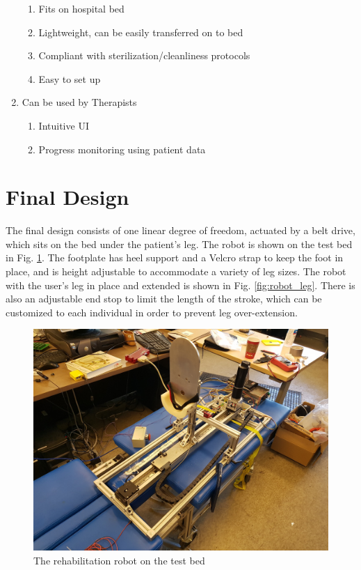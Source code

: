 \documentclass[12pt]{report}
\begin{document}
\begin{enumerate}[label*=\arabic*.]
\begin{enumerate}[label*=\arabic*.]
		\item Fits on hospital bed 
		\item Lightweight, can be easily transferred on to bed
		\item Compliant with sterilization/cleanliness protocols 
		\item Easy to set up 
	\end{enumerate}
	\item Can be used by Therapists
	\begin{enumerate}[label*=\arabic*.]
		\item Intuitive UI
		\item Progress monitoring using patient data
	\end{enumerate}

\end{enumerate}			

\section{Final Design} 

	The final design consists of one linear degree of freedom, actuated by a belt drive, which sits on the bed under the patient's leg. The robot is shown on the test bed in Fig. \ref{fig:robot_on_bed}. The footplate has heel support and a Velcro strap to keep the foot in place, and is height adjustable to accommodate a variety of leg sizes. The robot with the user's leg in place and extended is shown in Fig. \ref{fig:robot_leg}. There is also an adjustable end stop to limit the length of the stroke, which can be customized to each individual in order to prevent leg over-extension. 

	\begin{figure}[h] 
		\centering
		\includegraphics[width=0.75\linewidth]{device_on_bed}
		\caption{The rehabilitation robot on the test bed}
		\label{fig:robot_on_bed}
	\end{figure}
\end{document}
